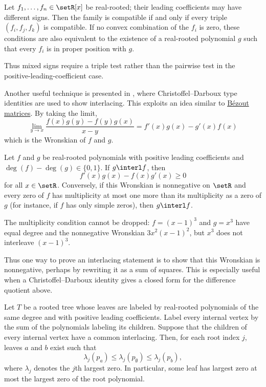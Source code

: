 \begin{theorem}
Let $f_1,\dotsc,f_n\in\setR[x]$ be real-rooted; their leading coefficients
may have different signs.  Then the family is compatible if and only if
every triple $(f_i,f_j,f_k)$ is compatible.  If no convex combination of the
$f_i$ is zero, these conditions are also equivalent to the existence of a
real-rooted polynomial $g$ such that every $f_i$ is in proper position with
$g$.
\end{theorem}
Thus mixed signs require a triple test rather than the pairwise test in the
positive-leading-coefficient case.

Another useful technique is presented in \cite{Bencs2014},
where Christoffel--Darboux type identities are used to show interlacing.
This exploits an idea similar to \hyperref[bezoutMatrix]{Bézout matrices}.
By taking the limit,
\[
\lim_{y\to x} \frac{f(x)g(y)-f(y)g(x)}{x-y} = f'(x)g(x) - g'(x)f(x)
\]
which is the Wronskian of $f$ and $g$.

\begin{proposition}
\label{wronskianCriterion}
Let $f$ and $g$ be real-rooted polynomials with positive leading
coefficients and $\deg(f)-\deg(g)\in\{0,1\}$.  If $g \interl f$, then
\[
  f'(x)g(x)-f(x)g'(x)\geq 0
\]
for all $x\in\setR$.  Conversely, if this Wronskian is nonnegative on
$\setR$ and every zero of $f$ has multiplicity at most one more than its
multiplicity as a zero of $g$ (for instance, if $f$ has only simple
zeros), then $g \interl f$.
\end{proposition}
The multiplicity condition cannot be dropped: $f=(x-1)^3$ and $g=x^3$ have
equal degree and the nonnegative Wronskian $3x^2(x-1)^2$, but $x^3$ does not
interleave $(x-1)^3$.

Thus one way to prove an interlacing statement is to show that this
Wronskian is nonnegative, perhaps by rewriting it as a sum of squares.
This is especially useful when a Christoffel--Darboux identity gives a
closed form for the difference quotient above.

\begin{theorem}
\label{interlacingFamilies}
Let $T$ be a rooted tree whose leaves are labeled by real-rooted
polynomials of the same degree and with positive leading coefficients.
Label every internal vertex by the sum of the polynomials labeling its
children. Suppose that the children of every internal vertex have a
common interlacing.  Then, for each root index $j$, leaves $a$ and $b$ exist
such that
\[
  \lambda_j(p_a)\leq \lambda_j(p_{\emptyset})\leq \lambda_j(p_b),
\]
where $\lambda_j$ denotes the $j$th largest zero.  In particular, some
leaf has largest zero at most the largest zero of the root polynomial.
\end{theorem}

